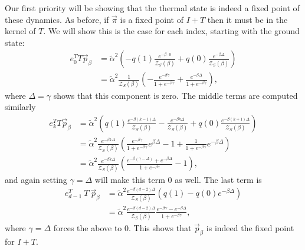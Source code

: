 \documentclass{article}
\newcommand{\partfun}{\mathcal{Z}}
\begin{document}
Our first priority will be showing that the thermal state is indeed a fixed point of these dynamics. As before, if $\vec{\pi}$ is a fixed point of $I + T$ then it must be in the kernel of $T$. We will show this is the case for each index, starting with the ground state:
\begin{align}
    e_0^T T \vec{p}_{\beta} &= \widetilde{\alpha}^2 \left( -q(1) \frac{e^{-\beta \cdot 0}}{\partfun_S(\beta)} + q(0) \frac{e^{-\beta \Delta}}{\partfun_S(\beta)} \right) \\
    &= \widetilde{\alpha}^2 \frac{1}{\partfun_S(\beta)} \left( - \frac{e^{-\beta \gamma}}{1 + e^{-\beta \gamma}} + \frac{e^{-\beta \Delta}}{1 + e^{-\beta \gamma}} \right),
\end{align}
where $\Delta = \gamma$ shows that this component is zero. 
The middle terms are computed similarly
\begin{align}
    e_k^T T \vec{p}_{\beta} &= \widetilde{\alpha}^2 \left( q(1) \frac{e^{-\beta (k - 1)\Delta }}{\partfun_S(\beta)} - \frac{e^{-\beta k \Delta}}{\partfun_S(\beta)} + q(0) \frac{e^{-\beta (k + 1) \Delta}}{\partfun_S(\beta)} \right) \\
    &= \widetilde{\alpha}^2 \frac{e^{-\beta k \Delta}}{\partfun_S(\beta)} \left( \frac{e^{-\beta \gamma}}{1 + e^{-\beta \gamma}} e^{\beta \Delta} - 1 + \frac{1}{1 + e^{-\beta \gamma}} e^{-\beta \Delta} \right) \\
    &= \widetilde{\alpha}^2 \frac{e^{-\beta k \Delta}}{\partfun_S(\beta)} \left( \frac{e^{-\beta (\gamma - \Delta)} + e^{-\beta \Delta}}{1 + e^{-\beta \gamma}} - 1 \right),  
\end{align}
and again setting $\gamma = \Delta$ will make this term 0 as well. The last term is
\begin{align}
    e_{d - 1}^T ~T ~\vec{p}_{\beta} &= \widetilde{\alpha}^2 \frac{e^{-\beta (d - 2) \Delta}}{\partfun_S(\beta)} \left( q(1) - q(0) e^{-\beta \Delta} \right) \\
    &= \widetilde{\alpha}^2 \frac{e^{-\beta (d - 2) \Delta}}{\partfun_S(\beta)} \frac{e^{-\beta \gamma} - e^{-\beta \Delta}}{1 + e^{-\beta \gamma}}, 
\end{align}
where $\gamma = \Delta$ forces the above to 0. This shows that $\vec{p}_{\beta}$ is indeed the fixed point for $I + T$. 
\end{document}
